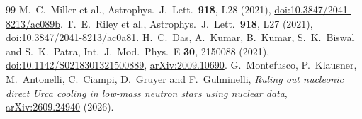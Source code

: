 \documentclass[11pt,a4paper]{article}
\newcommand{\doi}[1]{\href{https://doi.org/#1}{doi:#1}}
\newcommand{\arxiv}[1]{\href{https://arxiv.org/abs/#1}{arXiv:#1}}
\begin{document}
\begin{thebibliography}{99}
 M.~C.~Miller et al., Astrophys.\ J.\ Lett.\ \textbf{918}, L28 (2021), \doi{10.3847/2041-8213/ac089b}.
 T.~E.~Riley et al., Astrophys.\ J.\ Lett.\ \textbf{918}, L27 (2021), \doi{10.3847/2041-8213/ac0a81}.
 H.~C.~Das, A.~Kumar, B.~Kumar, S.~K.~Biswal and S.~K.~Patra, Int.\ J.\ Mod.\ Phys.\ E \textbf{30}, 2150088 (2021), \doi{10.1142/S0218301321500889}, \arxiv{2009.10690}.
 G.~Montefusco, P.~Klausner, M.~Antonelli, C.~Ciampi, D.~Gruyer and F.~Gulminelli, \emph{Ruling out nucleonic direct Urca cooling in low-mass neutron stars using nuclear data}, \arxiv{2609.24940} (2026).
\end{thebibliography}
\end{document}
